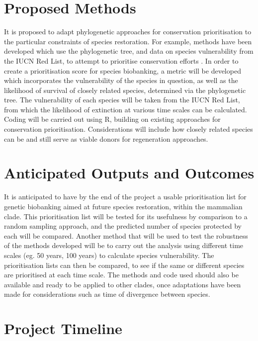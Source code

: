 \documentclass[11pt,titlepage]{article}
\begin{document}
	\section{Proposed Methods}
	It is proposed to adapt phylogenetic approaches for conservation prioritisation to the particular constraints of species restoration. For example, methods have been developed which use the phylogenetic tree, and data on species vulnerability from the IUCN Red List, to attempt to prioritise conservation efforts \cite{nunes_price_2015}. In order to create a prioritisation score for species biobanking, a metric will be developed which incorporates the vulnerability of the species in question, as well as the likelihood of survival of closely related species, determined via the phylogenetic tree. The vulnerability of each species will be taken from the IUCN Red List, from which the likelihood of extinction at various time scales can be calculated. Coding will be carried out using R, building on existing approaches for conservation prioritisation. Considerations will include how closely related species can be and still serve as viable donors for regeneration approaches.
	\section{Anticipated Outputs and Outcomes}
	It is anticipated to have by the end of the project a usable prioritisation list for genetic biobanking aimed at future species restoration, within the mammalian clade. This prioritisation list will be tested for its usefulness by comparison to a random sampling approach, and the predicted number of species protected by each will be compared. Another method that will be used to test the robustness of the methods developed will be to carry out the analysis using different time scales (eg. 50 years, 100 years) to calculate species vulnerability. The prioritisation lists can then be compared, to see if the same or different species are prioritised at each time scale. The methods and code used should also be available and ready to be applied to other clades, once adaptations have been made for considerations such as time of divergence between species.

	\section{Project Timeline}
	\newcommand{\rpt}[2][1]{%
		\forloop{loopcntr}{0}{\value{loopcntr}<#1}{#2}%
	}
	\newcommand{\on}[1][1]{
		\forloop{loopcntr}{0}{\value{loopcntr}<#1}{&\cellcolor{gray}}
	}
	\newcommand{\off}[1][1]{
		\forloop{loopcntr}{0}{\value{loopcntr}<#1}{&}
	}
\end{document}
